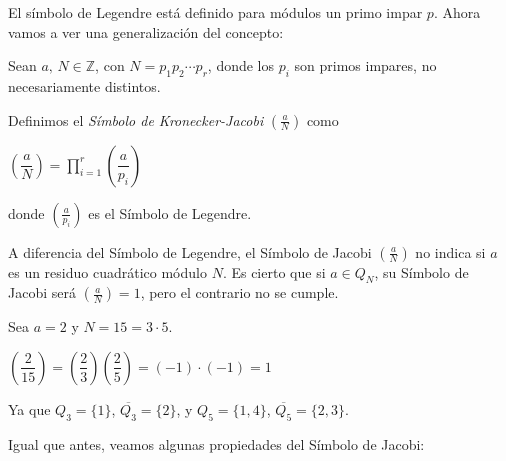 
El símbolo de Legendre está definido para módulos un primo impar $p$. Ahora vamos a ver una generalización del concepto:

\begin{definition}
	Sean $a,\,N\in \mathbb{Z}$, con $N = p_1 p_2 \cdots p_r$, donde los $p_i$ son primos impares, no necesariamente distintos.
	
	Definimos el \textit{Símbolo de Kronecker-Jacobi} $\left( \frac{a}{N} \right) $ como
		\begin{center}
			$
			\left( \dfrac{a}{N} \right) = \prod_{i=1}^{r} \left( \dfrac{a}{p_i} \right)
			$
		\end{center}
		
	donde $\left( \frac{a}{p_i} \right)$ es el Símbolo de Legendre.
	 
\end{definition}

\begin{remark}
	A diferencia del Símbolo de Legendre, el Símbolo de Jacobi $\left( \frac{a}{N} \right) $ no indica si $a$ es un residuo cuadrático módulo $N$. Es cierto que si $a \in Q_N$, su Símbolo de Jacobi será $\left( \frac{a}{N} \right) = 1$, pero el contrario no se cumple.
\end{remark}

\begin{example}
	Sea $a=2$ y $N=15=3\cdot 5$.
	\begin{center}
		$\left( \dfrac{2}{15} \right) = \left( \dfrac{2}{3} \right) \left( \dfrac{2}{5} \right) =  \left(-1\right) \cdot  \left(-1\right) = 1$
	\end{center}
	Ya que $Q_3 = \{1\}$, $\overline{Q_3}=\{2\}$, y $Q_5 = \{1,4\}$, $\overline{Q_5}=\{2,3\}$.
\end{example}

\hfil

Igual que antes, veamos algunas propiedades del Símbolo de Jacobi:


